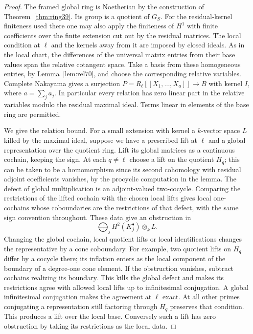 \documentclass[a4paper,11pt]{article}
\theoremstyle{definition}
\theoremstyle{remark}
\numberwithin{equation}{section}
\begin{document}
\begin{proof}
The framed global ring is Noetherian by the construction of
Theorem~\ref{thm:ring39}. Its group is a quotient of \(G_S\).
For the residual-kernel finiteness used there one may also apply
the finiteness of \(H^1\) with finite coefficients over the finite
extension cut out by the residual matrices. The local condition
at \(\ell\) and the kernels away from it are imposed by closed
ideals. As in the local chart, the differences of the universal
matrix entries from their base values span the relative cotangent
space. Take a basis from these homogeneous entries, by
Lemma~\ref{lem:rel70}, and choose the corresponding relative
variables. Complete Nakayama gives a surjection
\(P=R_\ell[[X_1,\ldots,X_a]]\to B\) with kernel \(I\), where
\(a=\sum_j a_j\). In particular every relation has zero
linear part in the relative variables modulo the residual
maximal ideal. Terms linear in elements of the base ring are
permitted.

We give the relation bound. For a small extension with kernel
a \(k\)-vector space \(L\) killed by the maximal ideal, suppose
we have a prescribed lift at \(\ell\) and a global representation
over the quotient ring. Lift its global matrices as a continuous
cochain, keeping the sign. At each \(q\ne\ell\) choose a lift
on the quotient \(H_q\); this can be taken to be a homomorphism
since its second cohomology with residual adjoint coefficients
vanishes, by the procyclic computation in the lemma. The defect
of global multiplication is an adjoint-valued two-cocycle.
Comparing the restrictions of the lifted cochain with the chosen
local lifts gives local one-cochains whose coboundaries are the
restrictions of that defect, with the same sign convention throughout.
These data give an obstruction in
\[
            \bigoplus_j H^2(K_j^\bullet)\otimes_k L .
\]
Changing the global cochain, local quotient lifts or local
identifications changes the representative by a cone coboundary.
For example, two quotient lifts on \(H_q\) differ by a cocycle
there; its inflation enters as the local component of the
boundary of a degree-one cone element. If the obstruction
vanishes, subtract cochains realizing its boundary. This kills
the global defect and makes its restrictions agree with allowed
local lifts up to infinitesimal conjugation. A global
infinitesimal conjugation makes the agreement at \(\ell\)
exact. At all other primes conjugating a representation still
factoring through \(H_q\) preserves that condition. This
produces a lift over the local base. Conversely such a lift
has zero obstruction by taking its restrictions as the local data.


\end{proof}
\end{document}
